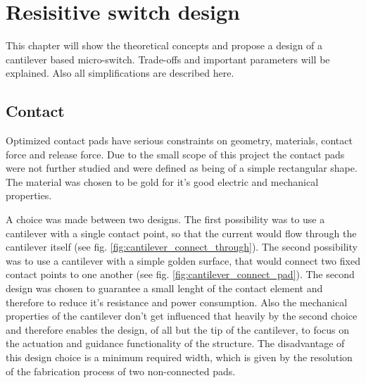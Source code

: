 \section{Resisitive switch design}
\label{sec:resisitive_switch_design}
This chapter will show the theoretical concepts and propose a design of a cantilever based micro-switch.
Trade-offs and important parameters will be explained.
Also all simplifications are described here.

\subsection{Contact}
\label{sec:contact}
Optimized contact pads have serious constraints on geometry, materials, contact force and release force. 
Due to the small scope of this project the contact pads were not further studied and were defined as being of a simple rectangular shape.
The material was chosen to be gold for it's good electric and mechanical properties. 

A choice was made between two designs.
The first possibility was to use a cantilever with a single contact point, so that the current would flow through the cantilever itself (see fig. \ref{fig:cantilever_connect_through}). %
The second possibility was to use a cantilever with a simple golden surface, that would connect two fixed contact points to one another (see fig. \ref{fig:cantilever_connect_pad}). %
The second design was chosen to guarantee a small lenght of the contact element and therefore to reduce it's resistance and power consumption.
Also the mechanical properties of the cantilever don't get influenced that heavily by the second choice and therefore enables the design, of all but the tip of the cantilever, to focus on the actuation and guidance functionality of the structure.
The disadvantage of this design choice is a minimum required width, which is given by the resolution of the fabrication process of two non-connected pads.

